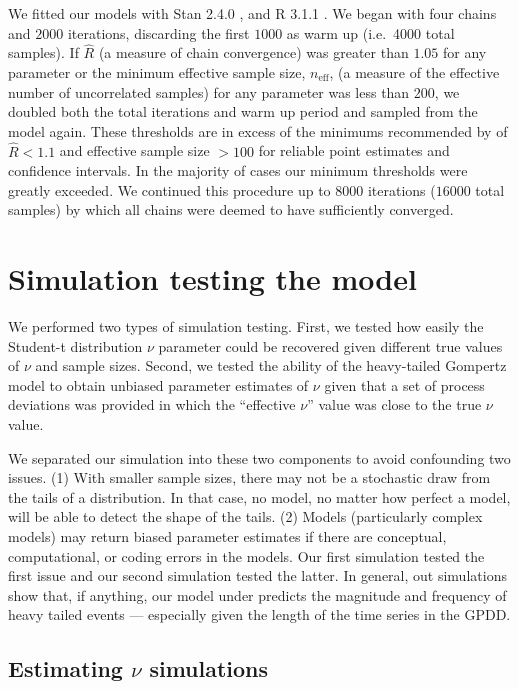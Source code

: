 We fitted our models with Stan 2.4.0 \citep{stan-manual2014}, and R 3.1.1
\citep{r2014}. We began with four chains and $2000$ iterations, discarding the
first $1000$ as warm up (i.e.~4000 total samples). If $\hat{R}$ (a measure of
chain convergence) was greater than $1.05$ for any parameter or the minimum
effective sample size, $n_\mathrm{eff}$, (a measure of the effective number of
uncorrelated samples) for any parameter was less than $200$, we doubled both the
total iterations and warm up period and sampled from the model again. These
thresholds are in excess of the minimums recommended by \citet{gelman2006a} of
$\hat{R} < 1.1$ and effective sample size $> 100$ for reliable point estimates
and confidence intervals. In the majority of cases our minimum thresholds were
greatly exceeded. We continued this procedure up to $8000$ iterations ($16000$
total samples) by which all chains were deemed to have sufficiently converged.

\section{Simulation testing the model}

We performed two types of simulation testing. First, we tested how easily the
Student-t distribution $\nu$ parameter could be recovered given different true
values of $\nu$ and sample sizes. Second, we tested the ability of the
heavy-tailed Gompertz model to obtain unbiased parameter estimates of $\nu$
given that a set of process deviations was provided in which the ``effective
$\nu$'' value was close to the true $\nu$ value.

We separated our simulation into these two components to avoid confounding two
issues. (1) With smaller sample sizes, there may not be a stochastic draw from
the tails of a distribution. In that case, no model, no matter how perfect
a model, will be able to detect the shape of the tails. (2) Models (particularly
complex models) may return biased parameter estimates if there are conceptual,
computational, or coding errors in the models. Our first simulation tested the
first issue and our second simulation tested the latter. In general, out
simulations show that, if anything, our model under predicts the magnitude and
frequency of heavy tailed events --- especially given the length of the time
series in the GPDD.

\subsection{Estimating $\nu$ simulations}

